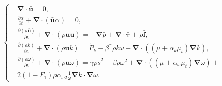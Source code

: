 \documentclass[mathematics,article,submit,pdftex,moreauthors]{Definitions/mdpi}
\begin{document}
\begin{linenomath}
\begin{equation}
	\label{vofKWSST}
	\left\{
		\begin{aligned}
			&\boldsymbol{\nabla} \cdot \bar{\boldsymbol{u}} = 0,\\
			&\frac{\partial \alpha}{\partial t} + \boldsymbol{\nabla} \cdot (\bar{\boldsymbol{u}} \alpha) = 0,\\
			&\frac{\partial (\rho \bar{\boldsymbol{u}})}{\partial t} + \boldsymbol{\nabla} \cdot (\rho \bar{\boldsymbol{u}} \bar{\boldsymbol{u}}) = -\boldsymbol{\nabla} \bar{p} + \boldsymbol{\nabla} \cdot \bar{\boldsymbol{\tau}} + \rho \bar{\boldsymbol{f}},\\
			&\frac{\partial (\rho k)}{\partial t} + \boldsymbol{\nabla} \cdot (\rho \bar{\boldsymbol{u}} k) = \widetilde{P}_k - \beta^*\rho k \omega + \boldsymbol{\nabla} \cdot \left( (\mu + \alpha_k \mu_t) \boldsymbol{\nabla} k \right),\\
			&\frac{\partial (\rho \omega)}{\partial t}  + \boldsymbol{\nabla} \cdot ( \rho \bar{\boldsymbol{u}} \omega) = \gamma \rho \dot{s}^2 - \beta \rho \omega^2 + \boldsymbol{\nabla} \cdot \left( (\mu + \alpha_\omega \mu_t) \boldsymbol{\nabla} \omega \right) + \\
			&2 (1 - F_1) \rho \alpha_{\omega 2} \frac{1}{\omega} \boldsymbol{\nabla} k \cdot \boldsymbol{\nabla} \omega.
		\end{aligned}
	\right.
\end{equation}
\end{linenomath}
\end{document}
